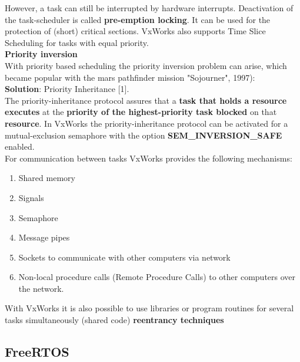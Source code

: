 However, a task can still be interrupted by hardware interrupts. Deactivation of the task-scheduler is called \textbf{pre-emption locking}. It can be used for the protection of (short) critical sections. VxWorks also supports Time Slice Scheduling for tasks with equal priority.\\

\os{\newpage}
{\rot\bf Priority inversion}\\

With priority based scheduling the priority inversion problem can arise, which became popular with the mars pathfinder mission "Sojourner", 1997): \\

\textbf{Solution}: Priority Inheritance [1].\\

The priority-inheritance protocol assures that a\textbf{ task that holds a resource executes} at the \textbf{priority of the highest-priority task blocked} on that \textbf{resource}. In VxWorks the priority-inheritance protocol can be activated for a mutual-exclusion semaphore with the option \textbf{SEM\_INVERSION\_SAFE} enabled. \\

\os{\newpage}
For communication between tasks VxWorks provides the following mechanisms:

\begin{enumerate}
\item  Shared memory

\item  Signals

\item  Semaphore

\item  Message pipes

\item  Sockets to communicate with other computers via network

\item  Non-local procedure calls (Remote Procedure Calls) to other computers over the network.
\end{enumerate}

With VxWorks it is also possible to use libraries or program routines for several tasks simultaneously (shared code)  \textbf{reentrancy techniques}

\subsection{ FreeRTOS}

